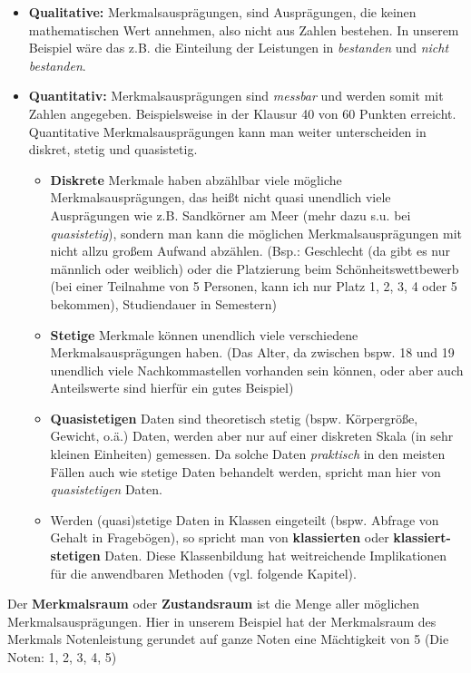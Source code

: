 \documentclass[a4paper]{article}
\begin{document}
\begin{itemize}
     \item \textbf{Qualitative:}  Merkmalsausprägungen, sind Ausprägungen, die keinen mathematischen Wert annehmen, also nicht aus Zahlen bestehen. In unserem Beispiel wäre das z.B. die Einteilung der Leistungen in \textit{bestanden} und \textit{nicht bestanden}.
    \item \textbf{Quantitativ:} Merkmalsausprägungen sind \textit{messbar} und werden somit mit Zahlen angegeben. Beispielsweise in der Klausur 40 von 60 Punkten erreicht.
    Quantitative Merkmalsausprägungen kann man weiter unterscheiden in diskret, stetig und quasistetig.
    \begin{itemize}
        \item \textbf {Diskrete} Merkmale haben abz\"ahlbar viele m\"ogliche Merkmalsauspr\"agungen, das heißt nicht quasi unendlich viele Ausprägungen wie z.B. Sandkörner am Meer (mehr dazu s.u. bei \textit{quasistetig}), sondern man kann die möglichen Merkmalsausprägungen mit nicht allzu großem Aufwand abzählen.
        (Bsp.: Geschlecht (da gibt es nur männlich oder weiblich) oder die Platzierung beim Schönheitswettbewerb (bei einer Teilnahme von 5 Personen, kann ich nur Platz 1, 2, 3, 4 oder 5 bekommen), Studiendauer in Semestern)
        \item\textbf{Stetige} Merkmale können unendlich viele verschiedene Merkmalsausprägungen haben. (Das Alter, da zwischen bspw. 18 und 19 unendlich viele Nachkommastellen vorhanden sein können, oder aber auch Anteilswerte sind hierfür ein gutes Beispiel) 
        \item \textbf{Quasistetigen} Daten sind theoretisch stetig (bspw. Körpergröße, Gewicht, o.ä.) Daten, werden aber nur auf einer diskreten Skala (in sehr kleinen Einheiten) gemessen. Da solche Daten \textit{praktisch} in den meisten Fällen auch wie stetige Daten behandelt werden, spricht man hier von \textit{quasistetigen} Daten.
        \item Werden (quasi)stetige Daten in Klassen eingeteilt (bspw. Abfrage von Gehalt in Fragebögen), so spricht man von \textbf{klassierten} oder \textbf{klassiert-stetigen} Daten. Diese Klassenbildung hat weitreichende Implikationen für die anwendbaren Methoden (vgl. folgende Kapitel).
    \end{itemize}
\end{itemize}
Der \textbf{Merkmalsraum} oder \textbf{Zustandsraum} ist die Menge aller möglichen Merkmalsausprägungen. Hier in unserem Beispiel hat der Merkmalsraum des Merkmals Notenleistung gerundet auf ganze Noten eine M\"achtigkeit von 5 (Die Noten: 1, 2, 3, 4, 5)
\end{document}
